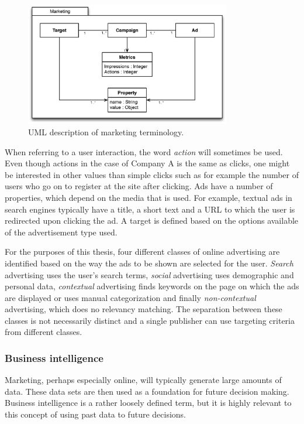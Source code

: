 \documentclass{sig-alternate}
\begin{document}
\begin{figure}[htb] \centering \includegraphics[width=0.8\textwidth]{marketing-uml.eps}
	\caption{UML description of marketing terminology.}
	\label{fig:MarketingTerminology}
\end{figure}

When referring to a user interaction, the word \emph{action} will sometimes be used. Even though actions in the case of Company A is the same as clicks, one might be interested in other values than simple clicks such as for example the number of users who go on to register at the site after clicking. Ads have a number of properties, which depend on the media that is used. For example, textual ads in search engines typically have a title, a short text and a URL to which the user is redirected upon clicking the ad. A target is defined based on the options available of the advertisement type used.

For the purposes of this thesis, four different classes of online advertising are identified based on the way the ads to be shown are selected for the user. \emph{Search} advertising uses the user's search terms, \emph{social} advertising uses demographic and personal data, \emph{contextual} advertising finds keywords on the page on which the ads are displayed or uses manual categorization and finally \emph{non-contextual} advertising, which does no relevancy matching. The separation between these classes is not necessarily distinct and a single publisher can use targeting criteria from different classes.

\subsubsection{Business intelligence}
Marketing, perhaps especially online, will typically generate large amounts of data. These data sets are then used as a foundation for future decision making. Business intelligence is a rather loosely defined term, but it is highly relevant to this concept of using past data to future decisions.
\end{document}
